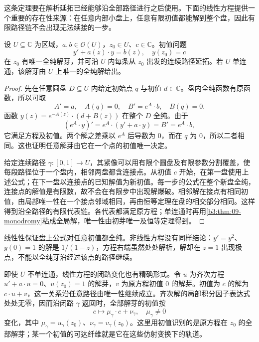 这条定理要在解析延拓已经能够沿全部路径进行之后使用。下面的线性方程提供一个重要的存在性来源：在任意内部小盘上，任意有限初值都能解到整个盘，因此有限路径链不会出现无法续接的一步。

\begin{proposition}[线性微分方程的延拓]\label{b3:prop:09-linear-ode}
设 \(U\subseteq\mathbb C\) 为区域，\(a,b\in\mathcal O(U)\)，\(z_0\in U\)、\(c\in\mathbb C\)。初值问题
\[
 y'+a(z)\cdot y=b(z),\quad y(z_0)=c
\]
在 \(z_0\) 有唯一全纯解芽，并可沿 \(U\) 内每条从 \(z_0\) 出发的连续路径延拓。若 \(U\) 单连通，该解芽由 \(U\) 上唯一的全纯解给出。
\end{proposition}
\begin{proof}
先在任意圆盘 \(D\subseteq U\) 内给定初始点 \(q\) 与初值 \(d\in\mathbb C\)。盘内全纯函数有原函数，所以可取
\[
 A'=a,\quad A(q)=0,\quad
 B'=e^A\cdot b,\quad B(q)=0.
\]
函数 \(y(z)=e^{-A(z)}\cdot(d+B(z))\) 在整个 \(D\) 全纯。由于
\[
 (e^A\cdot y)'=e^A\cdot(y'+a\cdot y)=B'=e^A\cdot b,
\]
它满足方程及初值。两个解之差乘以 \(e^A\) 后导数为 \(0\)，而在 \(q\) 为 \(0\)，所以二者相同。这也证明任意解芽由它在一个点的初值唯一决定。

给定连续路径 \(\gamma:[0,1]\rightarrow U\)，其紧像可以用有限个圆盘及有限参数分割覆盖，使每段路径位于一个盘内，相邻两盘都含连接点。从初值 \(c\) 开始，在第一盘使用上述公式；在下一盘以连接点的已知解值为新初值。每一步的公式在整个新盘全纯，连接点的解值是有限数，故不会在有限步中出现解爆破。相邻解在接点有相同初值，由局部唯一性在一个接点邻域相同，再由恒等定理在盘的相交部分相同。这样得到沿全路径的有限代表链。各代表都满足原方程；单连通时再用\cref{b3:thm:09-monodromy}粘成全局解，唯一性由初芽唯一及恒等定理得到。
\end{proof}

线性性保证盘上公式对任意初值都全纯。非线性方程没有同样结论：\(y'=y^2\)、\(y(0)=1\) 的解是 \(1/(1-z)\)，方程右端虽然处处解析，解却在 \(z=1\) 出现极点，不能以全纯芽沿经过该点的路径继续。

\ProseParagraphBreak
即使 \(U\) 不单连通，线性方程的闭路变化也有精确形式。令 \(u\) 为齐次方程 \(u'+a\cdot u=0\)、\(u(z_0)=1\) 的解芽，\(v\) 为原方程初值 \(0\) 的解芽。初值为 \(c\) 的解为 \(c\cdot u+v\)，这一关系沿任意路径由唯一性继续成立。齐次解的局部积分因子表达式处处无零，因而沿闭路 \(\gamma\) 返回时，全部解芽的初值按
\[
 c\longmapsto\mu_\gamma\cdot c+\nu_\gamma,\quad
 \mu_\gamma\ne0
\]
变化，其中 \(\mu_\gamma=u_\gamma(z_0)\)、\(\nu_\gamma=v_\gamma(z_0)\)。这里用初值识别的是原方程在 \(z_0\) 的全部解芽；某一个初值的可达纤维就是它在这些仿射变换下的轨道。

